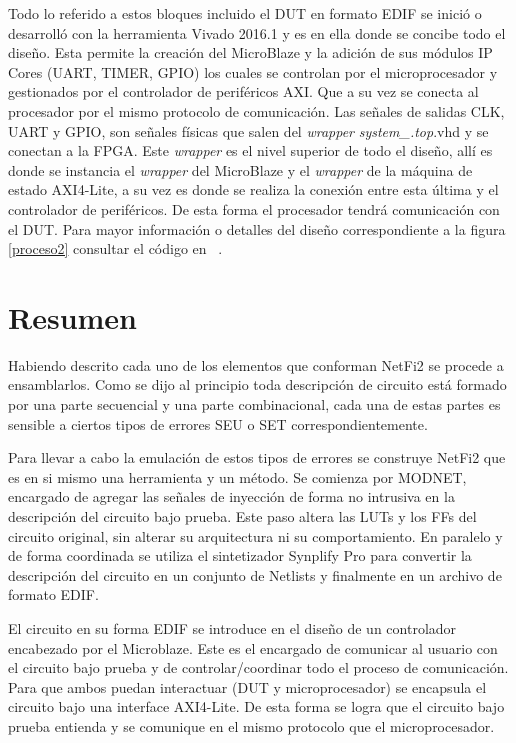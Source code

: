 \documentclass[a4paper,openright,12pt]{report}
\begin{document}
    Todo lo referido a estos bloques incluido el DUT en formato EDIF se inició o desarrolló con la herramienta Vivado 2016.1 y es en ella donde se concibe todo el diseño. Esta permite la creación del MicroBlaze y la adición de sus módulos IP Cores (UART, TIMER, GPIO) los cuales se controlan por el microprocesador y gestionados por el controlador de periféricos AXI. Que a su vez se conecta al procesador por el mismo protocolo de comunicación. Las señales de salidas  CLK, UART y GPIO, son señales físicas que salen del \textit{wrapper} \textit{system\_.top}.vhd y se conectan a la FPGA. Este \textit{wrapper} es el nivel superior de todo el diseño, allí es donde se instancia el \textit{wrapper} del MicroBlaze y el \textit{wrapper} de la máquina de estado AXI4-Lite, a su vez es donde se realiza la conexión entre esta última y el controlador de periféricos. De esta forma el procesador tendrá comunicación con el DUT. Para mayor información o detalles del diseño correspondiente a la figura \ref{proceso2} consultar el código en  ~\cite{Nandu}.
      

  
  \section{Resumen}
 
 Habiendo descrito cada uno de los elementos que conforman NetFi2 se procede a ensamblarlos.
 Como se dijo al principio toda descripción de  circuito está formado por una parte secuencial y una parte combinacional, cada una de estas partes es sensible a ciertos tipos de errores SEU o SET correspondientemente.
 
 Para llevar a cabo la emulación de estos tipos de errores se construye NetFi2 que es en si mismo una  herramienta y un método. Se comienza por MODNET, encargado  de agregar las señales de inyección de forma no intrusiva en la descripción del circuito bajo prueba. Este paso altera las LUTs y los FFs del circuito original, sin alterar su arquitectura ni su comportamiento. En paralelo y de forma coordinada se utiliza el sintetizador Synplify Pro para convertir la descripción del circuito en un conjunto de Netlists y finalmente en un archivo de formato EDIF.
 
El circuito en su forma EDIF se introduce en el diseño de un controlador encabezado por el Microblaze. Este es el encargado de comunicar al usuario con el circuito bajo prueba y de controlar/coordinar todo el proceso de comunicación. Para que ambos puedan interactuar (DUT y microprocesador) se encapsula el circuito bajo una interface AXI4-Lite. De esta forma se logra que el circuito bajo prueba entienda  y se comunique en el mismo protocolo que el microprocesador.
\end{document}
